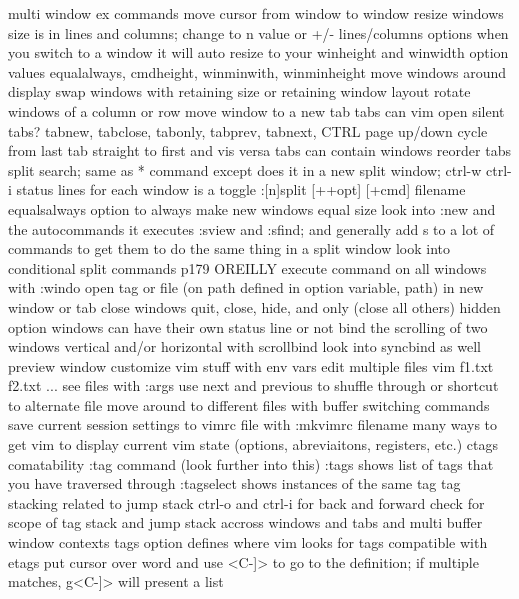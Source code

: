 \documentclass[12pt]{book}
\begin{document}
{{      multi window ex commands
      move cursor from window to window
      resize windows
        size is in lines and columns; change to n value or +/- lines/columns
        options
          when you switch to a window it will auto resize to your winheight and winwidth option values
          equalalways, cmdheight, winminwith, winminheight
      move windows around display
        swap windows with retaining size or retaining window layout
        rotate windows of a column or row
        move window to a new tab
      tabs
        can vim open silent tabs?
        tabnew, tabclose, tabonly, tabprev, tabnext, CTRL page up/down
        cycle from last tab straight to first and vis versa
        tabs can contain windows
        reorder tabs
      split search; same as * command except does it in a new split window; ctrl-w ctrl-i
      status lines for each window is a toggle
      :[n]split [++opt] [+cmd] filename
      equalsalways option to always make new windows equal size
      look into :new and the autocommands it executes
      :sview and :sfind; and generally add s to a lot of commands to get them to do the same thing in a split window
      look into conditional split commands p179 OREILLY
      execute command on all windows with :windo
      open tag or file (on path defined in option variable, path) in new window or tab
      close windows
        quit, close, hide, and only (close all others)
          hidden option
      windows can have their own status line or not
      bind the scrolling of two windows vertical and/or horizontal with scrollbind
        look into syncbind as well
      preview window
    customize vim stuff with env vars
    edit multiple files
      vim f1.txt f2.txt ...
      see files with :args
      use next and previous to shuffle through or shortcut to alternate file
    move around to different files with buffer switching commands
    save current session settings to vimrc file with :mkvimrc filename
  many ways to get vim to display current vim state (options, abreviaitons, registers, etc.)
  ctags comatability
    :tag command (look further into this)
    :tags shows list of tags that you have traversed through
    :tagselect shows instances of the same tag
    tag stacking
      related to jump stack
      ctrl-o and ctrl-i for back and forward
      check for scope of tag stack and jump stack accross windows and tabs and multi buffer window contexts
    tags option defines where vim looks for tags
    compatible with etags
    put cursor over word and use <C-]> to go to the definition; if multiple matches, g<C-]> will present a list
}}
\end{document}
